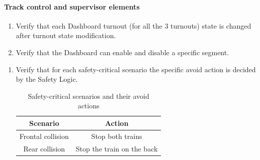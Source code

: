 \paragraph{Track control and supervisor elements}
\begin{enumerate}[label=Test-DB-\arabic*, leftmargin=*, format=\small]
	\item Verify that each Dashboard turnout (for all the 3 turnouts) state is changed after turnout state modification.
	\item Verify that the Dashboard can enable and disable a specific segment.
\end{enumerate}

\begin{enumerate}[label=Test-SL-\arabic*, leftmargin=*, format=\small]
	\item Verify that for each safety-critical scenario the specific avoid action is decided by the Safety Logic. 
	\begin{table}[h]
		\caption{Safety-critical scenarios and their avoid actions}
		\label{table:Safety-critical_scenarios}
		\begin{center}
			\renewcommand{\arraystretch}{1.8}
			\begin{tabu} 
				to 0.9 \textwidth
				{  c  c }
				\toprule
				Scenario          & Action                     \\ \midrule
				Frontal collision & Stop both trains           \\
				Rear collision    & Stop the train on the back \\ \bottomrule
			\end{tabu}
		\end{center}
	\end{table} 
\end{enumerate}